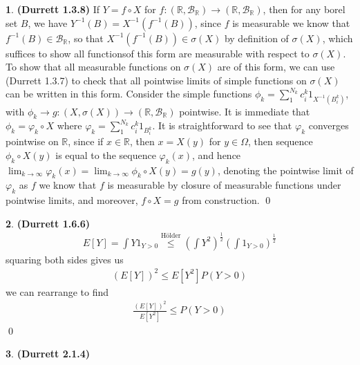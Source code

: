 \documentclass[10.5pt]{article}
\theoremstyle{definition}
\newtheorem{pb}{}
\begin{document}
    \begin{pb} \textbf{(Durrett 1.3.8)}
        If \(Y = f\circ X\) for \(f: (\mathbb{R},\mathcal{B}_\mathbb{R}) \to (\mathbb{R},\mathcal{B}_\mathbb{R})\), then for any borel set \(B\), we have \(Y^{-1}(B) = X^{-1}(f^{-1}(B))\), since \(f\) is measurable we know that \(f^{-1}(B) \in \mathcal{B}_\mathbb{R}\), so that \(X^{-1}(f^{-1}(B)) \in \sigma(X)\) by definition of \(\sigma(X)\), which suffices to show all functionsof this form are measurable with respect to \(\sigma(X)\). To show that all measurable functions on \(\sigma(X)\) are of this form, we can use (Durrett 1.3.7) to check that all pointwise limits of simple functions on \(\sigma(X)\) can be written in this form. Consider the simple functions \(\phi_k = \sum_1^{N_k} c^k_i 1_{X^{-1}(B^k_i)}\), with \(\phi_k \to g: (X,\sigma(X)) \to (\mathbb{R},\mathcal{B}_\mathbb{R})\) pointwise. It is immediate that \(\phi_k = \varphi_k\circ X\) where \(\varphi_k = \sum_1^{N_k}c^k_i 1_{B_i^k}\). It is straightforward to see that \(\varphi_k\) converges pointwise on \(\mathbb{R}\), since if \(x \in \mathbb{R}\), then \(x = X(y)\) for \(y \in \Omega\), then sequence \(\phi_k\circ X (y)\) is equal to the sequence \(\varphi_k (x)\), and hence \(\lim_{k\to\infty}\varphi_k(x) = \lim_{k\to\infty}\phi_k\circ X (y) = g(y)\), denoting the pointwise limit of \(\varphi_k\) as \(f\) we know that \(f\) is measurable by closure of measurable functions under pointwise limits, and moreover, \(f \circ X = g\) from construction. \qed
    \end{pb}
    \begin{pb}\textbf{(Durrett 1.6.6)}
        \begin{align*}
            E[Y] = \int Y 1_{Y>0} \overset{\text{H\"older}}{\leq} \left(\int Y^2\right)^{\frac12}\left(\int 1_{Y>0}\right)^{\frac12}
        \end{align*}
        squaring both sides gives us
        \begin{align*}
            (E[Y])^2 \leq E[Y^2]P(Y>0)
        \end{align*}
        we can rearrange to find
        \begin{align*}
            \frac{(E[Y])^2}{E[Y^2]} \leq P(Y>0)
        \end{align*} \qed
    \end{pb}
    \begin{pb}\textbf{(Durrett 2.1.4)}
        
    \end{pb}
\end{document}
